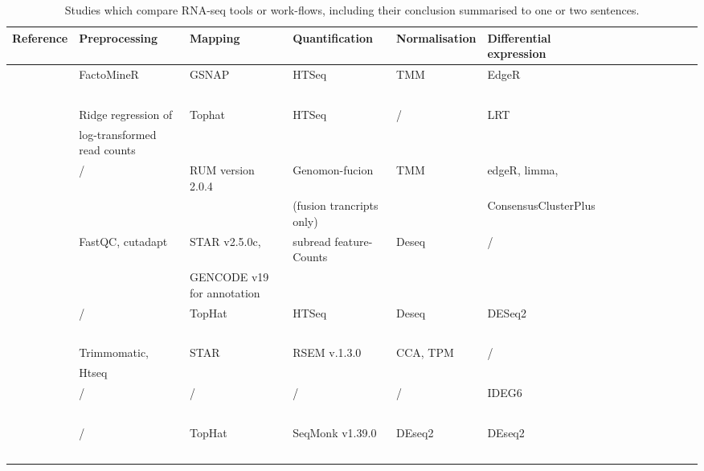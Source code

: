 \begin{landscape}
	\pagestyle{empty}
\begin{table}[h]
	\footnotesize
    \centering
    \captionsetup{font=footnotesize}
    \caption{Studies which compare RNA-seq tools or work-flows, including their conclusion summarised to one or two sentences.}
	\label{tab:rnaseq_experiments}
    \begin{tabular}{llllllllllllll}
		\toprule
		\textbf{Reference} & \textbf{Preprocessing} & \textbf{Mapping} & \textbf{Quantification} & \textbf{Normalisation} & \textbf{Differential expression}  \\ \midrule
        \cite{cardoso2019gene} & FactoMineR & GSNAP & HTSeq & TMM &  EdgeR  \\
        ~ & ~ & ~ & ~ & ~ &   \\ \hline
        \cite{mostafavi2014type} & Ridge regression of  & Tophat & HTSeq & / & LRT  \\
        ~ & log-transformed read counts & ~ & ~ & ~ &   \\ \hline
        \cite{shiozawa2017gene} & / & RUM version 2.0.4 & Genomon-fucion  & TMM & edgeR, limma,   \\
        ~ & ~ & ~ & (fusion trancripts only) & ~ & ConsensusClusterPlus  \\ \hline
        \cite{schubert2018perturbation} & FastQC, cutadapt & STAR  v2.5.0c,  & subread feature-Counts & Deseq & /  \\
        ~ & ~ & GENCODE v19 for annotation & ~ & ~ &   \\ \hline
        \cite{schmiedel2018impact} & / & TopHat & HTSeq & Deseq & DESeq2  \\
        ~ & ~ & ~ & ~ & ~ &   \\ \hline
        \cite{lee2020lineage} &  Trimmomatic,  & STAR & RSEM v.1.3.0  & CCA, TPM & /  \\
        ~ & Htseq & ~ & ~ & ~ &   \\ \hline
        \cite{wang2013dynamic} & / & / & / & / & IDEG6  \\
        ~ & ~ & ~ & ~ & ~ &   \\ \hline
        \cite{gatt2021tyrosol} & / & TopHat & SeqMonk  v1.39.0 & DEseq2 & DEseq2  \\ 
        ~ & ~ & ~ & ~ & ~ &   \\ \bottomrule
    \end{tabular}
\end{table}
\end{landscape}

